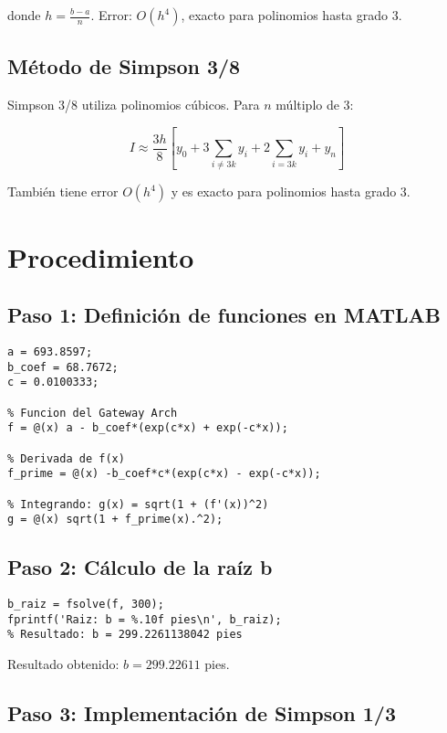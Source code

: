 \documentclass[conference]{IEEEtran}
\begin{document}
donde $h = \frac{b-a}{n}$. Error: $O(h^4)$, exacto para polinomios hasta grado 3.

\subsection{Método de Simpson 3/8}

Simpson 3/8 utiliza polinomios cúbicos. Para $n$ múltiplo de 3:

\begin{equation}
I \approx \frac{3h}{8}\left[y_0 + 3\sum_{i\neq 3k}y_i + 2\sum_{i=3k}y_i + y_n\right]
\end{equation}

También tiene error $O(h^4)$ y es exacto para polinomios hasta grado 3.

\section{Procedimiento}

\subsection{Paso 1: Definición de funciones en MATLAB}

\begin{lstlisting}[caption={Definición de constantes y funciones}]
% Constantes del Gateway Arch
a = 693.8597;
b_coef = 68.7672;
c = 0.0100333;

% Funcion del Gateway Arch
f = @(x) a - b_coef*(exp(c*x) + exp(-c*x));

% Derivada de f(x)
f_prime = @(x) -b_coef*c*(exp(c*x) - exp(-c*x));

% Integrando: g(x) = sqrt(1 + (f'(x))^2)
g = @(x) sqrt(1 + f_prime(x).^2);
\end{lstlisting}

\subsection{Paso 2: Cálculo de la raíz b}

\begin{lstlisting}[caption={Encontrar la raíz donde f(x) = 0}]
% Usar fsolve con valor inicial x0=300
b_raiz = fsolve(f, 300);
fprintf('Raiz: b = %.10f pies\n', b_raiz);
% Resultado: b = 299.2261138042 pies
\end{lstlisting}

Resultado obtenido: $b = 299.22611$ pies.

\subsection{Paso 3: Implementación de Simpson 1/3}
\end{document}
